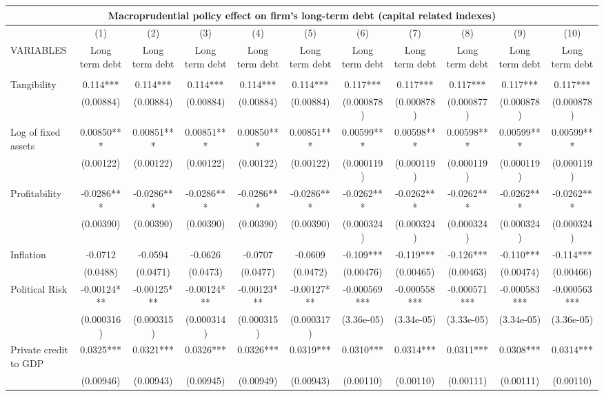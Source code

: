 \begin{tabular}{lcccccccccc}
\multicolumn{11}{c}{Macroprudential policy effect on firm's long-term debt (capital related indexes)} \\ \hline
 & (1) & (2) & (3) & (4) & (5) & (6) & (7) & (8) & (9) & (10) \\
VARIABLES & Long term debt & Long term debt & Long term debt & Long term debt & Long term debt & Long term debt & Long term debt & Long term debt & Long term debt & Long term debt \\ \hline
 &  &  &  &  &  &  &  &  &  &  \\
Tangibility & 0.114*** & 0.114*** & 0.114*** & 0.114*** & 0.114*** & 0.117*** & 0.117*** & 0.117*** & 0.117*** & 0.117*** \\
 & (0.00884) & (0.00884) & (0.00884) & (0.00884) & (0.00884) & (0.000878) & (0.000878) & (0.000877) & (0.000878) & (0.000878) \\
Log of fixed assets & 0.00850*** & 0.00851*** & 0.00851*** & 0.00850*** & 0.00851*** & 0.00599*** & 0.00598*** & 0.00598*** & 0.00599*** & 0.00599*** \\
 & (0.00122) & (0.00122) & (0.00122) & (0.00122) & (0.00122) & (0.000119) & (0.000119) & (0.000119) & (0.000119) & (0.000119) \\
Profitability & -0.0286*** & -0.0286*** & -0.0286*** & -0.0286*** & -0.0286*** & -0.0262*** & -0.0262*** & -0.0262*** & -0.0262*** & -0.0262*** \\
 & (0.00390) & (0.00390) & (0.00390) & (0.00390) & (0.00390) & (0.000324) & (0.000324) & (0.000324) & (0.000324) & (0.000324) \\
Inflation & -0.0712 & -0.0594 & -0.0626 & -0.0707 & -0.0609 & -0.109*** & -0.119*** & -0.126*** & -0.110*** & -0.114*** \\
 & (0.0488) & (0.0471) & (0.0473) & (0.0477) & (0.0472) & (0.00476) & (0.00465) & (0.00463) & (0.00474) & (0.00466) \\
Political Risk & -0.00124*** & -0.00125*** & -0.00124*** & -0.00123*** & -0.00127*** & -0.000569*** & -0.000558*** & -0.000571*** & -0.000583*** & -0.000563*** \\
 & (0.000316) & (0.000315) & (0.000314) & (0.000315) & (0.000317) & (3.36e-05) & (3.34e-05) & (3.33e-05) & (3.34e-05) & (3.36e-05) \\
Private credit to GDP & 0.0325*** & 0.0321*** & 0.0326*** & 0.0326*** & 0.0319*** & 0.0310*** & 0.0314*** & 0.0311*** & 0.0308*** & 0.0314*** \\
 & (0.00946) & (0.00943) & (0.00945) & (0.00949) & (0.00943) & (0.00110) & (0.00110) & (0.00111) & (0.00111) & (0.00110) \\

\end{tabular}
